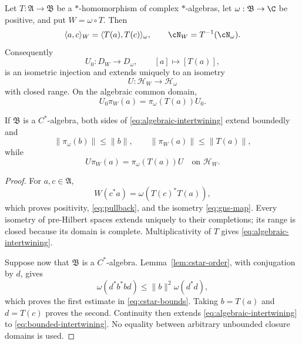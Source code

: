 \begin{theorem}
\label{thm:dagger}
Let $T:\mathfrak A\to\mathfrak B$ be a $*$-homomorphism of complex
$*$-algebras, let $\omega:\mathfrak B\to\C$ be positive, and put
$W=\omega\circ T$.  Then
\begin{equation}
 \langle a,c\rangle_W
 =\langle T(a),T(c)\rangle_\omega,
 \qquad
 \cN_W=T^{-1}(\cN_\omega).
 \label{eq:pullback}
\end{equation}
Consequently
\begin{equation}
 U_0:D_W\longrightarrow D_\omega,
 \qquad [a]\longmapsto[T(a)],
 \label{eq:gns-map}
\end{equation}
is an isometric injection and extends uniquely to an isometry
\begin{equation}
 U:\mathcal H_W\longrightarrow\mathcal H_\omega
 \label{eq:completion-map}
\end{equation}
with closed range.  On the algebraic common domain,
\begin{equation}
 U_0\pi_W(a)=\pi_\omega(T(a))U_0.
 \label{eq:algebraic-intertwining}
\end{equation}

If $\mathfrak B$ is a $C^*$-algebra, both sides of
\eqref{eq:algebraic-intertwining} extend boundedly and
\begin{equation}
 \|\pi_\omega(b)\|\leq\|b\|,
 \qquad
 \|\pi_W(a)\|\leq\|T(a)\|,
 \label{eq:cstar-bounds}
\end{equation}
while
\begin{equation}
 U\pi_W(a)=\pi_\omega(T(a))U
 \quad\text{on }\mathcal H_W.
 \label{eq:bounded-intertwining}
\end{equation}
\end{theorem}

\begin{proof}
For $a,c\in\mathfrak A$,
\[
 W(c^*a)=\omega(T(c)^*T(a)),
\]
which proves positivity, \eqref{eq:pullback}, and the isometry
\eqref{eq:gns-map}.  Every isometry of pre-Hilbert spaces extends
uniquely to their completions; its range is closed because its domain is
complete.  Multiplicativity of $T$ gives
\eqref{eq:algebraic-intertwining}.

Suppose now that $\mathfrak B$ is a $C^*$-algebra.  Lemma~\ref{lem:cstar-order}, with conjugation by $d$, gives
\[
 \omega(d^*b^*bd)\leq\|b\|^2\omega(d^*d),
\]
which proves the first estimate in \eqref{eq:cstar-bounds}.  Taking
$b=T(a)$ and $d=T(c)$ proves the second.  Continuity then extends
\eqref{eq:algebraic-intertwining} to
\eqref{eq:bounded-intertwining}.  No equality between arbitrary
unbounded closure domains is used.
\end{proof}

